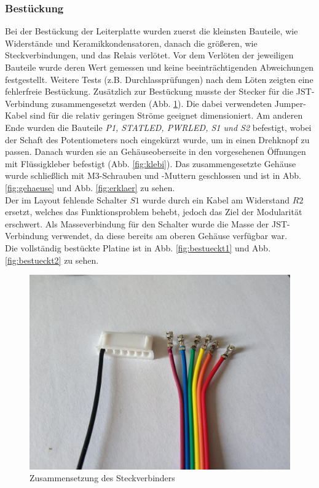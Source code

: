 \documentclass[a4paper, 12pt]{article}
\begin{document}
    \subsubsection{Bestückung}
    Bei der Bestückung der Leiterplatte wurden zuerst die kleinsten Bauteile, wie Widerstände und Keramikkondensatoren, danach die größeren, wie Steckverbindungen, und das Relais verlötet. Vor dem Verlöten der jeweiligen Bauteile wurde deren Wert gemessen und keine beeinträchtigenden Abweichungen festgestellt. Weitere Tests (z.B. Durchlassprüfungen) nach dem Löten zeigten eine fehlerfreie Bestückung. Zusätzlich zur Bestückung musste der Stecker für die JST-Verbindung zusammengesetzt werden (Abb. \ref{fig:jstloet}). Die dabei verwendeten Jumper-Kabel sind für die relativ geringen Ströme geeignet dimensioniert. Am anderen Ende wurden die Bauteile \emph{P1, STATLED, PWRLED, S1 und S2} befestigt, wobei der Schaft des Potentiometers noch eingekürzt wurde, um in einen Drehknopf zu passen. Danach wurden sie an Gehäuseoberseite in den vorgesehenen Öffnungen mit Flüssigkleber befestigt (Abb. \ref{fig:klebi}). Das zusammengesetzte Gehäuse wurde schließlich mit M3-Schrauben und -Muttern geschlossen und ist in Abb. \ref{fig:gehaeuse} und Abb. \ref{fig:erklaer} zu sehen.\\

    Der im Layout fehlende Schalter $S1$ wurde durch ein Kabel am Widerstand $R2$ ersetzt, welches das Funktionsproblem behebt, jedoch das Ziel der Modularität erschwert. Als Masseverbindung für den Schalter wurde die Masse der JST-Verbindung verwendet, da diese bereits am oberen Gehäuse verfügbar war.\\

    Die vollständig bestückte Platine ist in Abb. \ref{fig:bestueckt1} und Abb. \ref{fig:bestueckt2} zu sehen.

    \begin{figure}[H]
    \begin{center}
    \includegraphics[page=1, width=0.5\linewidth]{graphics/jstloet.jpg}
    \caption{Zusammensetzung des Steckverbinders}
    \label{fig:jstloet}
    \end{center}
    \end{figure}
\end{document}
